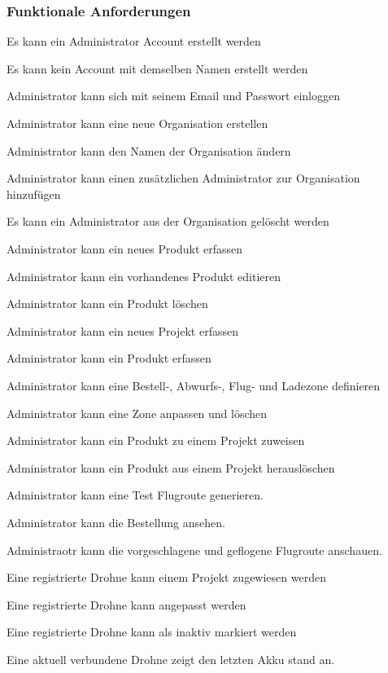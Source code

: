 \subsubsection{Funktionale Anforderungen}	
\begin{todolist}
	\item[\done] Es kann ein Administrator Account erstellt werden
	\item[\done] Es kann kein Account mit demselben Namen erstellt werden
	\item[\done] Administrator kann sich mit seinem Email und Passwort einloggen
	\item[\done] Administrator kann eine neue Organisation erstellen
	\item[\done] Administrator kann den Namen der Organisation ändern
	\item[\done] Administrator kann einen zusätzlichen Administrator zur Organisation hinzufügen
	\item[\done] Es kann ein Administrator aus der Organisation gelöscht werden
	\item[\done] Administrator kann ein neues Produkt erfassen
	\item[\done] Administrator kann ein vorhandenes Produkt editieren
	\item[\done] Administrator kann ein Produkt löschen
	\item[\done] Administrator kann ein neues Projekt erfassen
	\item[\done] Administrator kann ein Produkt erfassen
	\item[\done] Administrator kann eine Bestell-, Abwurfs-, Flug- und Ladezone definieren
	\item[\done] Administrator kann eine Zone anpassen und löschen
	\item[\done] Administrator kann ein Produkt zu einem Projekt zuweisen
	\item[\done] Administrator kann ein Produkt aus einem Projekt herauslöschen
	\item[\done] Administrator kann eine Test Flugroute generieren.

	\item[\done] Administrator kann die Bestellung ansehen.
	\item[\done] Administraotr kann die vorgeschlagene und geflogene Flugroute anschauen.

	\item[\done] Eine registrierte Drohne kann einem Projekt zugewiesen werden
	\item[\done] Eine registrierte Drohne kann angepasst werden
	\item[\done] Eine registrierte Drohne kann als inaktiv markiert werden
	\item[\done] Eine aktuell verbundene Drohne zeigt den letzten Akku stand an.


\end{todolist}
